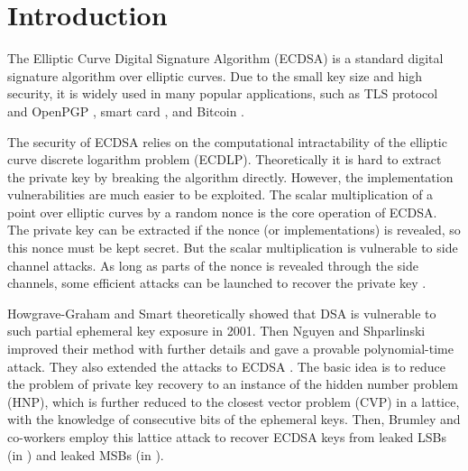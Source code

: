 
\section{Introduction}
\label{sec:intro}
The Elliptic Curve Digital Signature Algorithm (ECDSA) \cite{Johnson2001, ansi2005} is a standard digital signature algorithm over elliptic curves.
Due to the small key size and high security, it is widely used in many popular applications, such as TLS protocol \cite{rfc5246} and OpenPGP \cite{openpgp2007}, smart card \cite{smartcard2007}, and Bitcoin \cite{bitcoin2008}.

The security of ECDSA relies on the computational intractability of the elliptic curve discrete logarithm problem (ECDLP).
Theoretically it is hard to extract the private key by breaking the algorithm directly.
However, the implementation vulnerabilities are much easier to be exploited.
The scalar multiplication of a point over elliptic curves by a random nonce is the core operation of ECDSA.
The private key can be extracted if the nonce (or implementations) is revealed,
so this nonce must be kept secret.
But the scalar multiplication is vulnerable to side channel attacks.
As long as parts of the nonce is revealed through the side channels,
 some efficient attacks can be launched to recover the private key \cite{Nguyen2001,HG2001,Nguyen2002,Nguyen2003}.

Howgrave-Graham and Smart \cite{HG2001} theoretically showed that DSA is vulnerable to such partial ephemeral key exposure in 2001.
Then Nguyen and Shparlinski \cite{Nguyen2002} improved their method with further details and gave a provable polynomial-time attack.
They also extended the attacks to ECDSA \cite{Nguyen2003}.
The basic idea is to reduce the problem of private key recovery to an instance of the hidden number problem
(HNP), which is further reduced to the closest vector problem (CVP) in a lattice, with the knowledge of consecutive bits of the ephemeral keys.
Then, Brumley and co-workers employ this lattice attack to recover ECDSA keys from leaked LSBs (in \cite{Brumley2009}) and leaked MSBs (in \cite{Brumley2011}).



